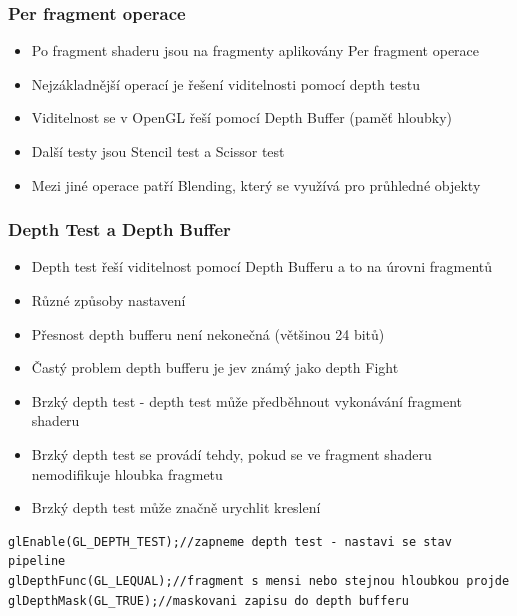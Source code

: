 
\begin{frame}[fragile]
\frametitle{Per fragment operace}
  \begin{itemize}
  \item Po fragment shaderu jsou na fragmenty aplikovány Per fragment operace
  \item Nejzákladnější operací je řešení viditelnosti pomocí depth testu
  \item Viditelnost se v OpenGL řeší pomocí Depth Buffer (paměť hloubky)
  \item Další testy jsou Stencil test a Scissor test
  \item Mezi jiné operace patří Blending, který se využívá pro průhledné objekty
  \end{itemize}
\end{frame}


\begin{frame}[fragile]
\frametitle{Depth Test a Depth Buffer}
  \begin{itemize}
  \item Depth test řeší viditelnost pomocí Depth Bufferu a to na úrovni fragmentů
  \item Různé způsoby nastavení
  \item Přesnost depth bufferu není nekonečná (většinou 24 bitů)
  \item Častý problem depth bufferu je jev známý jako depth Fight
  \item Brzký depth test - depth test může předběhnout vykonávání fragment shaderu
  \item Brzký depth test se provádí tehdy, pokud se ve fragment shaderu nemodifikuje hloubka fragmetu
  \item Brzký depth test může značně urychlit kreslení
  \end{itemize}
  {\scriptsize
  \begin{verbatim}
glEnable(GL_DEPTH_TEST);//zapneme depth test - nastavi se stav pipeline
glDepthFunc(GL_LEQUAL);//fragment s mensi nebo stejnou hloubkou projde
glDepthMask(GL_TRUE);//maskovani zapisu do depth bufferu
  \end{verbatim}
  }
\end{frame}

